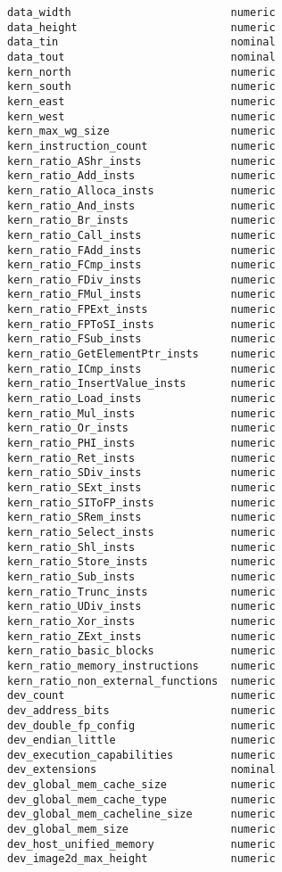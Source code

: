 \begin{multicols}{2}
\begin{Verbatim}[fontsize=\footnotesize]
data_width                         numeric
data_height                        numeric
data_tin                           nominal
data_tout                          nominal
kern_north                         numeric
kern_south                         numeric
kern_east                          numeric
kern_west                          numeric
kern_max_wg_size                   numeric
kern_instruction_count             numeric
kern_ratio_AShr_insts              numeric
kern_ratio_Add_insts               numeric
kern_ratio_Alloca_insts            numeric
kern_ratio_And_insts               numeric
kern_ratio_Br_insts                numeric
kern_ratio_Call_insts              numeric
kern_ratio_FAdd_insts              numeric
kern_ratio_FCmp_insts              numeric
kern_ratio_FDiv_insts              numeric
kern_ratio_FMul_insts              numeric
kern_ratio_FPExt_insts             numeric
kern_ratio_FPToSI_insts            numeric
kern_ratio_FSub_insts              numeric
kern_ratio_GetElementPtr_insts     numeric
kern_ratio_ICmp_insts              numeric
kern_ratio_InsertValue_insts       numeric
kern_ratio_Load_insts              numeric
kern_ratio_Mul_insts               numeric
kern_ratio_Or_insts                numeric
kern_ratio_PHI_insts               numeric
kern_ratio_Ret_insts               numeric
kern_ratio_SDiv_insts              numeric
kern_ratio_SExt_insts              numeric
kern_ratio_SIToFP_insts            numeric
kern_ratio_SRem_insts              numeric
kern_ratio_Select_insts            numeric
kern_ratio_Shl_insts               numeric
kern_ratio_Store_insts             numeric
kern_ratio_Sub_insts               numeric
kern_ratio_Trunc_insts             numeric
kern_ratio_UDiv_insts              numeric
kern_ratio_Xor_insts               numeric
kern_ratio_ZExt_insts              numeric
kern_ratio_basic_blocks            numeric
kern_ratio_memory_instructions     numeric
kern_ratio_non_external_functions  numeric
dev_count                          numeric
dev_address_bits                   numeric
dev_double_fp_config               numeric
dev_endian_little                  numeric
dev_execution_capabilities         numeric
dev_extensions                     nominal
dev_global_mem_cache_size          numeric
dev_global_mem_cache_type          numeric
dev_global_mem_cacheline_size      numeric
dev_global_mem_size                numeric
dev_host_unified_memory            numeric
dev_image2d_max_height             numeric

\end{Verbatim}
\end{multicols}
